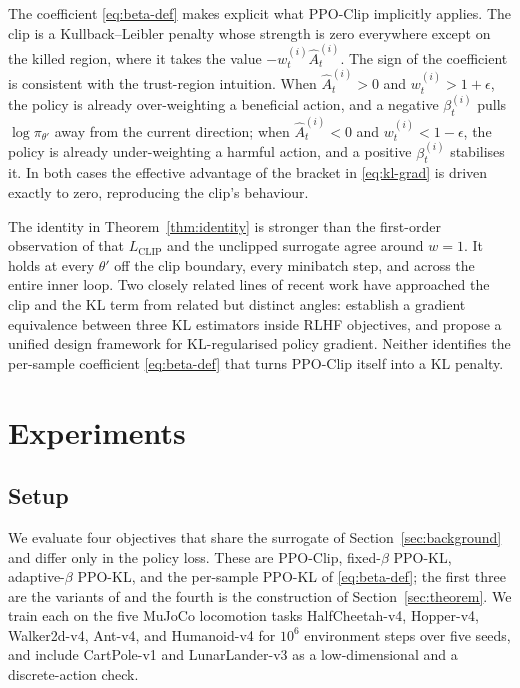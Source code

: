 \documentclass{article}
\begin{document}
The coefficient \eqref{eq:beta-def} makes explicit what PPO-Clip
implicitly applies. The clip is a Kullback--Leibler penalty whose
strength is zero everywhere except on the killed region, where it
takes the value $-w_t^{(i)} \hat{A}_t^{(i)}$. The sign of the
coefficient is consistent with the trust-region intuition. When
$\hat{A}_t^{(i)} > 0$ and $w_t^{(i)} > 1+\epsilon$, the policy is
already over-weighting a beneficial action, and a negative
$\beta_t^{(i)}$ pulls $\log \pi_{\theta'}$ away from the current
direction; when $\hat{A}_t^{(i)} < 0$ and $w_t^{(i)} < 1-\epsilon$,
the policy is already under-weighting a harmful action, and a
positive $\beta_t^{(i)}$ stabilises it. In both cases the effective
advantage of the bracket in \eqref{eq:kl-grad} is driven exactly to
zero, reproducing the clip's behaviour.

The identity in Theorem~\ref{thm:identity} is stronger than the
first-order observation of \citet{schulman2017ppo} that
$L_{\mathrm{CLIP}}$ and the unclipped surrogate agree around
$w = 1$. It holds at every $\theta'$ off the clip boundary, every minibatch
step, and across the entire inner loop. Two closely related lines of recent
work have approached the clip and the KL term from related but
distinct angles: \citet{yao2025rethinkingkl} establish a gradient
equivalence between three KL estimators inside RLHF objectives, and
\citet{zhang2026rpg} propose a unified design framework for
KL-regularised policy gradient. Neither identifies the per-sample
coefficient \eqref{eq:beta-def} that turns PPO-Clip itself into a
KL penalty.


\section{Experiments}
\label{sec:experiments}

\subsection{Setup}
\label{sec:exp-setup}


We evaluate four objectives that share the surrogate of
Section~\ref{sec:background} and differ only in the policy loss. These
are PPO-Clip, fixed-$\beta$ PPO-KL, adaptive-$\beta$ PPO-KL, and the
per-sample PPO-KL of \eqref{eq:beta-def}; the first three are the
variants of \citet{schulman2017ppo} and the fourth is the construction
of Section~\ref{sec:theorem}. We train each on the five MuJoCo locomotion
tasks \citep{todorov2012mujoco} HalfCheetah-v4, Hopper-v4, Walker2d-v4,
Ant-v4, and Humanoid-v4 for $10^6$ environment steps over five seeds, and
include CartPole-v1 and LunarLander-v3 as a low-dimensional and a
discrete-action check.
\end{document}
